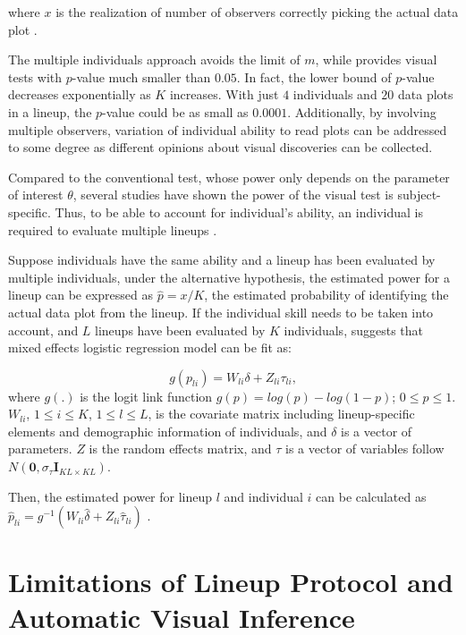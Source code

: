 \documentclass{monashthesis}
\theoremstyle{definition}
\theoremstyle{definition}
\theoremstyle{definition}
\theoremstyle{definition}
\theoremstyle{remark}
\begin{document}
where \(x\) is the realization of number of observers correctly picking the actual data plot \autocite{majumder_validation_2013}.

The multiple individuals approach avoids the limit of \(m\), while provides visual tests with \(p\)-value much smaller than \(0.05\). In fact, the lower bound of \(p\)-value decreases exponentially as \(K\) increases. With just \(4\) individuals and \(20\) data plots in a lineup, the \(p\)-value could be as small as \(0.0001\). Additionally, by involving multiple observers, variation of individual ability to read plots can be addressed to some degree as different opinions about visual discoveries can be collected.

Compared to the conventional test, whose power only depends on the parameter of interest \(\theta\), several studies \autocites[see][]{hofmann_graphical_2012,majumder_validation_2013,majumder_human_2014,roy_chowdhury_using_2015,loy_variations_2016} have shown the power of the visual test is subject-specific. Thus, to be able to account for individual's ability, an individual is required to evaluate multiple lineups \autocite{majumder_validation_2013}.

Suppose individuals have the same ability and a lineup has been evaluated by multiple individuals, under the alternative hypothesis, the estimated power for a lineup can be expressed as \(\hat{p} = x/K\), the estimated probability of identifying the actual data plot from the lineup. If the individual skill needs to be taken into account, and \(L\) lineups have been evaluated by \(K\) individuals, \textcite{majumder_validation_2013} suggests that mixed effects logistic regression model can be fit as:

\[g(p_{li}) = W_{li}\delta + Z_{li}\tau_{li},\]
where \(g(.)\) is the logit link function \(g(p) = log(p) - log(1-p)\); \(0 \leq p \leq 1\). \(W_{li}\), \(1 \leq i \leq K\), \(1 \leq l \leq L\), is the covariate matrix including lineup-specific elements and demographic information of individuals, and \(\delta\) is a vector of parameters. \(Z\) is the random effects matrix, and \(\tau\) is a vector of variables follow \(N(\boldsymbol{0},\sigma_{\tau}\boldsymbol{I}_{KL\times KL})\).

Then, the estimated power for lineup \(l\) and individual \(i\) can be calculated as \(\hat{p}_{li} = g^{-1}(W_{li}\hat{\delta} + Z_{li}\hat{\tau}_{li})\) \autocite{majumder_validation_2013}.

\hypertarget{limitations-of-lineup-protocol-and-automatic-visual-inference}{%
\section{Limitations of Lineup Protocol and Automatic Visual Inference}\label{limitations-of-lineup-protocol-and-automatic-visual-inference}}
\end{document}
